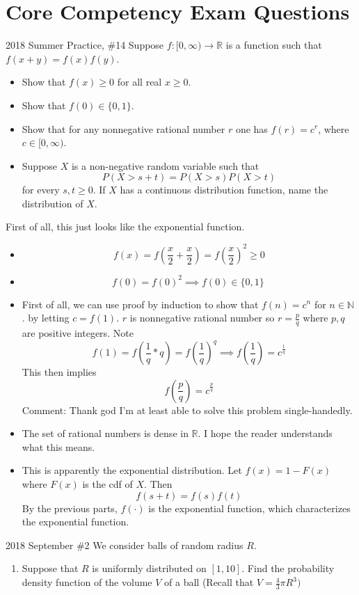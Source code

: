 \documentclass[../main]{subfiles}
\begin{document}
\section{Core Competency Exam Questions}
\begin{bbox}{{2018 Summer Practice, \#14}}
    Suppose $f: [0,\infty) \to \mathbb R$ is a function such that $f(x+y) = f(x)f(y)$.
    \begin{itemize}
        \item Show that $f(x)\geq 0$ for all real $x \geq 0$.
        \item Show that $f(0) \in \{0,1\}$.
        \item Show that for any nonnegative rational number $r$ one has $f(r)=c^r$, where $c\in[0,\infty)$.
        \item Suppose $X$ is a non-negative random variable such that 
        \[
        P(X > s+t) = P(X>s) P(X>t)
        \] for every $s,t \geq 0$. If $X$ has a continuous distribution function, name the distribution of $X$.
    \end{itemize}
\end{bbox}
\begin{solution}
    First of all, this just looks like the exponential function.
    \begin{itemize}
        \item \[
        f(x) = f(\frac{x}{2} + \frac{x}{2}) = f(\frac{x}{2})^2 \geq 0
        \]
        \item \[
        f(0) = f(0)^2 \implies f(0) \in \{0,1\}
        \
        \]
        \item First of all, we can use proof by induction to show that $f(n) = c^n$ for $n\in \mathbb N$. by letting $c = f(1)$.
        \newline
        $r$ is nonnegative rational number so $r=\frac{p}{q}$ where $p,q$ are positive integers. Note \[
        f(1) = f\left(\frac{1}{q} * q\right) =f\left(\frac{1}{q}\right)^q \implies f\left(\frac{1}{q}\right) = c^{\frac{1}{q}} 
        \]
        This then implies \[
        f\left(\frac{p}{q}\right) = c^{\frac{p}{q}}
        \]
        Comment: Thank god I'm at least able to solve this problem single-handedly.
        \item The set of rational numbers is dense in $\mathbb R$. I hope the reader understands what this means.
        \item This is apparently the exponential distribution.
        \newline
        Let $f(x) = 1 - F(x)$ where $F(x)$ is the cdf of $X$. Then 
        \[
        f(s+t) = f(s)f(t)
        \]
        By the previous parts, $f(\cdot)$ is the exponential function, which characterizes the exponential function.
    \end{itemize}
\end{solution}
\begin{bbox}{2018 September \#2}
    We consider balls of random radius $R$.
    \begin{enumerate}
        \item Suppose that $R$ is uniformly distributed on $[1,10]$. Find the probability density function of the volume $V$ of a ball (Recall that $V=\frac{4}{3}\pi R^3)$
    \end{enumerate}
\end{bbox}
\end{document}
